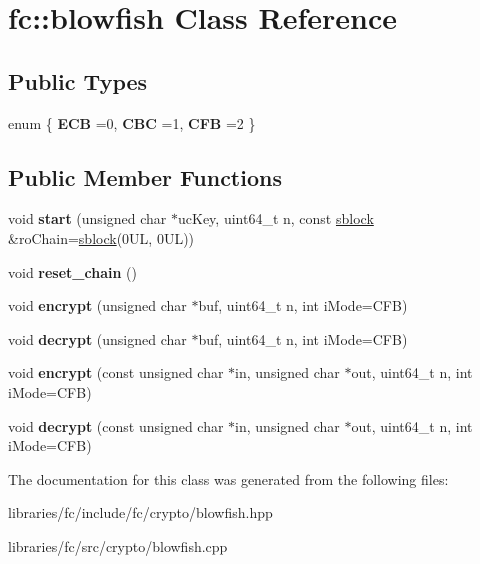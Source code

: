 \hypertarget{classfc_1_1blowfish}{}\section{fc\+:\+:blowfish Class Reference}
\label{classfc_1_1blowfish}
\subsection*{Public Types}
\begin{DoxyCompactItemize}
\item 
\mbox{\label{classfc_1_1blowfish_aaa379d1a337ea7c4729bcc775813a03c}} 
enum \{ {\bfseries E\+CB} =0, 
{\bfseries C\+BC} =1, 
{\bfseries C\+FB} =2
 \}
\end{DoxyCompactItemize}
\subsection*{Public Member Functions}
\begin{DoxyCompactItemize}
\item 
\mbox{\label{classfc_1_1blowfish_a867a7f6185f1ed29a60136496aaea8ef}} 
void {\bfseries start} (unsigned char $\ast$uc\+Key, uint64\+\_\+t n, const \mbox{\hyperlink{structfc_1_1sblock}{sblock}} \&ro\+Chain=\mbox{\hyperlink{structfc_1_1sblock}{sblock}}(0\+U\+L, 0\+U\+L))
\item 
\mbox{\label{classfc_1_1blowfish_aeafb623506fb88c0efa401430613847e}} 
void {\bfseries reset\+\_\+chain} ()
\item 
\mbox{\label{classfc_1_1blowfish_adb0d3d2c0327ce0ebfde779d33640448}} 
void {\bfseries encrypt} (unsigned char $\ast$buf, uint64\+\_\+t n, int i\+Mode=C\+FB)
\item 
\mbox{\label{classfc_1_1blowfish_a8217a4d3497c7318bec0ea220a040f27}} 
void {\bfseries decrypt} (unsigned char $\ast$buf, uint64\+\_\+t n, int i\+Mode=C\+FB)
\item 
\mbox{\label{classfc_1_1blowfish_aea929b3e9ff2884802075d71fe8ba9a7}} 
void {\bfseries encrypt} (const unsigned char $\ast$in, unsigned char $\ast$out, uint64\+\_\+t n, int i\+Mode=C\+FB)
\item 
\mbox{\label{classfc_1_1blowfish_ad5bed2becdbef8c8bf3be018a9fe95f1}} 
void {\bfseries decrypt} (const unsigned char $\ast$in, unsigned char $\ast$out, uint64\+\_\+t n, int i\+Mode=C\+FB)
\end{DoxyCompactItemize}


The documentation for this class was generated from the following files\+:\begin{DoxyCompactItemize}
\item 
libraries/fc/include/fc/crypto/blowfish.\+hpp\item 
libraries/fc/src/crypto/blowfish.\+cpp\end{DoxyCompactItemize}
